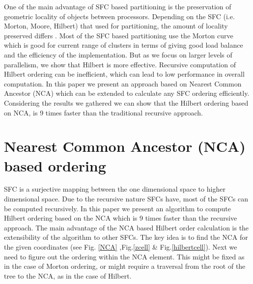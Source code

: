 \documentclass{sig-alternate}
\begin{document}
One of the main advantage of SFC based partitioning is the
preservation of geometric locality of objects between processors. Depending on the SFC (i.e. Morton, Moore, Hilbert) that used for partitioning, the amount of locality preserved differs \cite{bader2012}. 
Most of the SFC based partitioning use the Morton curve which is good for current range of clusters in terms of giving good load balance and the efficiency of the implementation. But as we focus on larger levels of parallelism, we show that Hilbert is more effective. Recursive computation of Hilbert ordering can be inefficient, which can lead to low performance in overall computation.
In this paper we present an approach based on Nearest Common Ancestor (NCA) which can be extended to calculate any SFC ordering efficiently. Considering the results we gathered we can show that
the Hilbert ordering based on NCA, is 9 times faster than the traditional recursive approach. 


\section{Nearest Common Ancestor (NCA) based ordering}
SFC is a surjective mapping between the one dimensional space to higher dimensional space. 
Due to the recursive nature SFCs have, most of the SFCs can be computed recursively. In this paper we present an algorithm to compute Hilbert ordering based on the NCA which is 9 times faster than the recursive approach.
The main advantage of the NCA based Hilbert order calculation is the extensibility of the algorithm to other SFCs. 
The key idea is to find the NCA for the given coordinates (see Fig. \ref{NCA} ,Fig.\ref{zcell} \& Fig.\ref{hilbertcell}).  Next we need to figure out the ordering within the NCA element. This might be fixed as in the case of Morton ordering, or might require a traversal from the root of the tree to the NCA, as in the case of Hilbert. 
\end{document}
